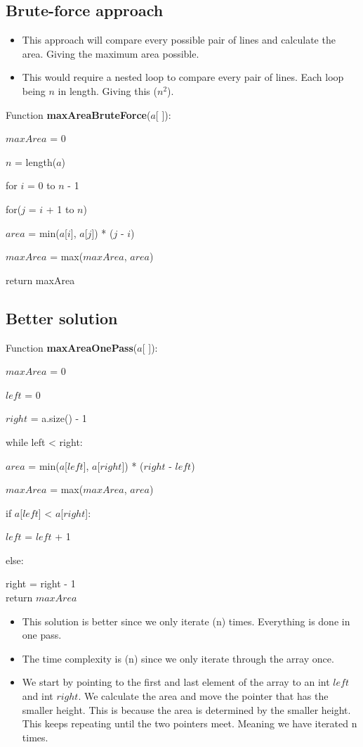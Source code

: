 \documentclass{article}[12pt]
\begin{document}
\subsection{Brute-force approach}
\begin{itemize}
  \item This approach will compare every possible pair of lines and calculate the area.
    Giving the maximum area possible.
  \item This would require a nested loop to compare every pair of lines.
    Each loop being $n$ in length. Giving this \Theta($n^2$).
\end{itemize}
Function \textbf{maxAreaBruteForce}($a$[ ]):

$maxArea$ = 0

$n$ = length($a$)

for $i$ = 0 to $n$ - 1{

  \indent \indent for($j$ = $i$ + 1 to $n$){

    \indent \indent \indent $area$ = min($a$[$i$], $a$[$j$]) * ($j$ - $i$)
      
          \indent \indent \indent $maxArea$ = max($maxArea$, $area$)
  }

  return maxArea
}

\pagebreak
\subsection{Better solution}

Function \textbf{maxAreaOnePass}($a$[ ]):

$maxArea$ = 0

$left$ = 0

$right$ = a.size() - 1

while left < right:

\indent \indent $area$ = min($a$[$left$], $a$[$right$]) * ($right$ - $left$)

\indent \indent $maxArea$ = max($maxArea$, $area$)
\hfill \break

\indent \indent if $a$[$left$] < $a$[$right$]:

\indent \indent \indent $left$ = $left$ + 1

\indent \indent else:

\indent \indent \indent right = right - 1 \\

\indent return $maxArea$

\hfill \break

\begin{itemize}
  \item This solution is better since we only iterate \Theta(n) times.
  Everything is done in one pass.
\item The time complexity is \Theta(n) since we only iterate through the array once.
\item We start by pointing to the first and last element of the array to an int $left$ and int $right$.
  We calculate the area and move the pointer that has the smaller height.
  This is because the area is determined by the smaller height.
  This keeps repeating until the two pointers meet. 
  Meaning we have iterated n times.
\end{itemize}
\newpage
\end{document}
